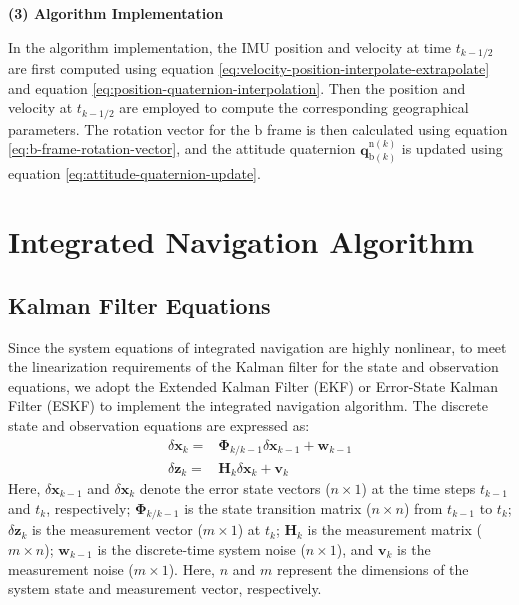 \documentclass{article}
\begin{document}
\textbf{(3) Algorithm Implementation}

In the algorithm implementation, the IMU position and velocity at time $t_{k-1/2}$ are first computed using 
equation \eqref{eq:velocity-position-interpolate-extrapolate} and equation \eqref{eq:position-quaternion-interpolation}. Then the position and velocity at $t_{k-1/2}$ are employed to compute the corresponding geographical parameters. The rotation vector for the $\mathrm{b}$ frame is then calculated using equation \eqref{eq:b-frame-rotation-vector}, and the attitude quaternion $\mathbf{q}_{\mathrm{b}(k)}^{\mathrm{n}(k)}$ is updated using equation \eqref{eq:attitude-quaternion-update}.

\section{Integrated Navigation Algorithm}

\subsection{Kalman Filter Equations}

Since the system equations of integrated navigation are highly nonlinear, to meet the linearization requirements of the Kalman filter for the state and observation equations, we adopt the Extended Kalman Filter (EKF) or Error-State Kalman Filter (ESKF) to implement the integrated navigation algorithm. The discrete state and observation equations are expressed as:
\begin{equation}
    \begin{aligned}
        \delta \boldsymbol{x}_{k} =& \boldsymbol{\Phi}_{k/k-1} \delta \boldsymbol{x}_{k-1} + \boldsymbol{w}_{k-1} \\
        \delta \boldsymbol{z}_{k} =& \boldsymbol{H}_{k} \delta \boldsymbol{x}_{k} + \boldsymbol{v}_{k}
    \end{aligned}
\end{equation}
%
Here, $\delta \boldsymbol{x}_{k-1}$ and $\delta \boldsymbol{x}_{k}$ denote the error state vectors ($n \times 1$) at the time steps ${t}_{k-1}$ and ${t_k}$, respectively; $\boldsymbol{\Phi}_{k/k-1}$ is the state transition matrix ($n \times n$) from ${t}_{k-1}$ to ${t_k}$; $\delta \boldsymbol{z}_{k}$ is the measurement vector ($m \times 1$) at ${t_k}$; $\boldsymbol{H}_{k}$ is the measurement matrix ($m \times n$); $\boldsymbol{w}_{k-1}$ is the discrete-time system noise ($n \times 1$), and $\boldsymbol{v}_{k}$ is the measurement noise ($m \times 1$). Here, $n$ and $m$ represent the dimensions of the system state and measurement vector, respectively.
\end{document}
